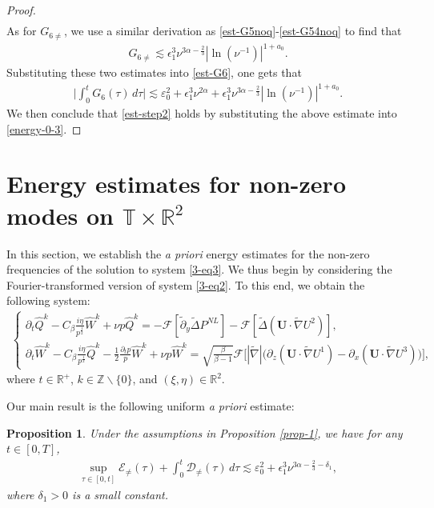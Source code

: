 \documentclass[11pt,reqno]{article}
\newtheorem{prop}[theo]{Proposition}
\numberwithin{equation}{section}
\newcommand\R{{\mathbb R}}
\newcommand\T{{\mathbb T}}
\newcommand\Z{{\mathbb Z}}
\newcommand\D{{\mathcal D}}
\newcommand\F{{\mathcal F}}
\newcommand\E{{\mathcal E}}
\newcommand\U{\bm{U}}
\let\pa=\partial
\let\al=\alpha
\let\var=\varepsilon
\let\f=\frac
\let\ep=\epsilon
\begin{document}
\begin{proof}
\begin{align*}
\end{align*}
As for $G_{6\not=}$, we use a similar derivation as \eqref{est-G5noq}-\eqref{est-G54noq} to find that
\begin{align*}
    G_{6\not=}\lesssim \ep_1^3\nu^{3\al-\f23}|\ln(\nu^{-1})|^{1+a_0}.
\end{align*}
Substituting these two estimates into \eqref{est-G6}, one gets that
\begin{align*}
    \Big|\int_0^t G_6(\tau)\,d\tau\Big| 
    \lesssim \var_0^2+
    \ep_1^3 \nu^{2\al}
    +\ep_1^3\nu^{3\al-\f23}|\ln(\nu^{-1})|^{1+a_0}.
\end{align*}
We then conclude that \eqref{est-step2} holds by substituting the above  estimate into \eqref{energy-0-3}.
\end{proof}






\section{Energy estimates for non-zero modes on \texorpdfstring{$\T\times\R^2$}{T x R2}}
\label{sec4:energy est nonzero}

In this section, we establish the \textit{a priori} energy estimates for the non-zero frequencies of the solution to system \eqref{3-eq3}. 
We thus begin by considering the Fourier-transformed version of system \eqref{3-eq2}. 
To this end, we obtain the following system:
\begin{align}\label{3-eq3}
\left\{\begin{array}{l}
	\displaystyle
	\pa_t \hat{Q}^k -C_{\beta} \f{i\eta}{p^{\f12}}\hat{W}^k+\nu p\hat{Q}^k
	=-\F[\tilde{\pa}_y\widetilde{\Delta} P^{NL}]-\F[\widetilde{\Delta}(\U\cdot\widetilde{\nabla}U^2)],
	\\[1ex]
	\displaystyle
	\pa_t \hat{W}^k-C_{\beta}  \f{i\eta}{p^{\f12}}\hat{Q}^k
	-\f12\f{\pa_{t}p}{p}\hat{W}^k
	+\nu p\hat{W}^k
	=\sqrt{\f{\beta}{\beta-1}} 
	\F\big[|\widetilde{\nabla}| 
	\big(
	\pa_{z}(\U\cdot\widetilde{\nabla}U^1)-\pa_{x}(\U \cdot\widetilde{\nabla}U^3)
	\big)\big],
\end{array}\right.
\end{align}
where $t\in\R^+$, $k\in\Z\backslash\{0\}$, and $(\xi,\eta)\in\R^2$.



Our main result is the following uniform \textit{a priori} estimate:
\begin{prop}\label{lemm-2}
Under the assumptions in Proposition \ref{prop-1},  we have for any $t\in[0,T]$,
\begin{align}\label{priori result-1}
	\sup_{\tau\in[0,t]}\E_{\not=}(\tau)
	+\int_0^t\D_{\not=}(\tau)\,d\tau
	\lesssim \var_0^2+\ep_1^3\nu^{3\alpha-\f23-\delta_1},
\end{align}
where $\delta_1>0$ is a small constant.
\end{prop}
\end{document}
